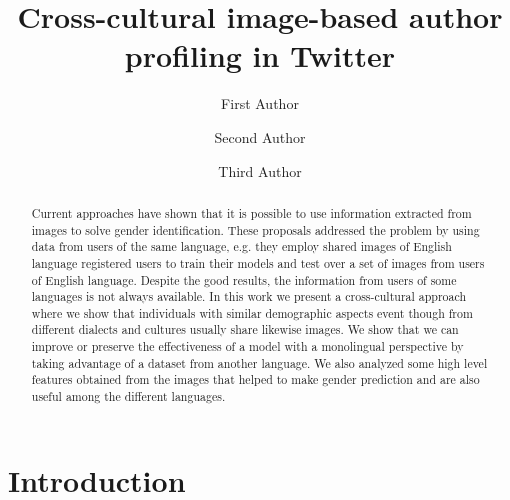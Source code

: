 \documentclass[runningheads]{llncs}
\begin{document}
%
\title{Cross-cultural image-based author profiling in Twitter}


\author{First Author \and
Second Author \and
Third Author}
%
%

\maketitle

\begin{abstract}

Current approaches have shown that it is possible to use information extracted from images to solve gender identification. These proposals addressed the problem by using data from users of the same language, e.g. they employ shared images of English language registered users to train their models and test over a set of images from users of English language. Despite the good results, the information from users of some languages is not always available. In this work we present a cross-cultural approach where we show that individuals with similar demographic aspects event though from different dialects and cultures usually share likewise images. We show that we can improve or preserve the effectiveness of a model with a monolingual perspective by taking advantage of a dataset from another language. We also analyzed some high level features obtained from the images that helped to make gender prediction and are also useful among the different languages.
\end{abstract}

\section{Introduction}
\end{document}
